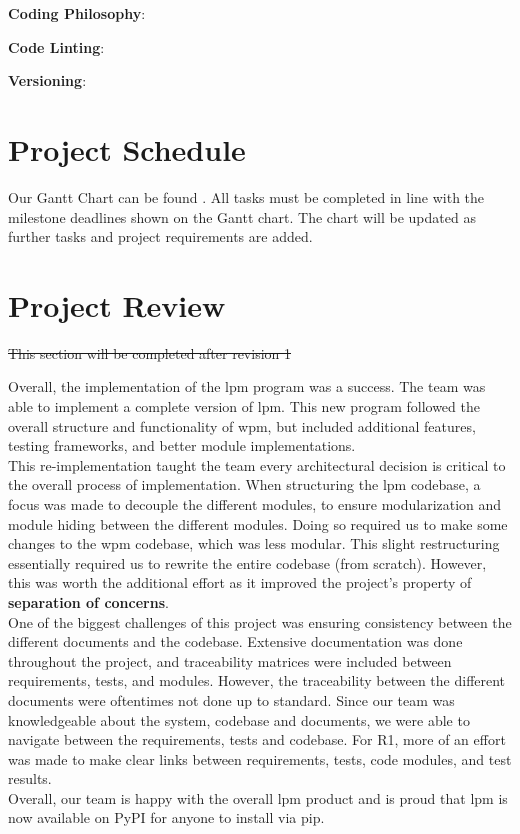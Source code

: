 \documentclass{article}
\begin{document}
\noindent \textbf{Coding Philosophy}: \href{https://www.python.org/dev/peps/pep-0020/}{\color{blue}{The Zen of Python (pep20)}}

\noindent \textbf{Code Linting}: \href{https://www.pylint.org/}{\color{blue}{pylint}}

\noindent \textbf{Versioning}: \href{https://semver.org/}{\color{blue}{Semantic Versioning 2.0}}

\section{Project Schedule}

Our Gantt Chart can be found \href{https://gitlab.cas.mcmaster.ca/modyj/3xa3/-/tree/master/ProjectSchedule}{\color{blue}{here}}. All tasks must be completed in line with the milestone deadlines shown on the Gantt chart. The chart will be updated as further tasks and project requirements are added.

\section{Project Review}

\sout{This section will be completed after revision 1} \\

\color{red}

Overall, the implementation of the lpm program was a success. The team was able to implement a complete version of lpm. This new program followed the overall structure and functionality of wpm, but included additional features, testing frameworks, and better module implementations.\\

This re-implementation taught the team every architectural decision is critical to the overall process of implementation. When structuring the lpm codebase, a focus was made to decouple the different modules, to ensure modularization and module hiding between the different modules. Doing so required us to make some changes to the wpm codebase, which was less modular. This slight restructuring essentially required us to rewrite the entire codebase (from scratch). However, this was worth the additional effort as it improved the project's property of \textbf{separation of concerns}.\\

One of the biggest challenges of this project was ensuring consistency between the different documents and the codebase. Extensive documentation was done throughout the project, and traceability matrices were included between requirements, tests, and modules. However, the traceability between the different documents were oftentimes not done up to standard. Since our team was knowledgeable about the system, codebase and documents, we were able to navigate between the requirements, tests and codebase. For R1, more of an effort was made to make clear links between requirements, tests, code modules, and test results.\\

Overall, our team is happy with the overall lpm product and is proud that lpm is now available on PyPI for anyone to install via pip.
\end{document}
